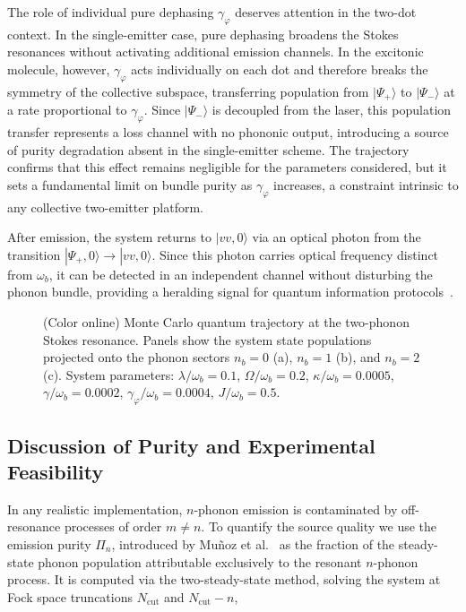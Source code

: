 \documentclass{ws-ijmpb}
\begin{document}
The role of individual pure dephasing $\gamma_\varphi$ deserves attention in the two-dot 
context. In the single-emitter case, pure dephasing broadens the Stokes resonances without 
activating additional emission channels. In the excitonic molecule, however, $\gamma_\varphi$ 
acts individually on each dot and therefore breaks the symmetry of the collective subspace, 
transferring population from $|\Psi_+\rangle$ to $|\Psi_-\rangle$ at a rate proportional to 
$\gamma_\varphi$. Since $|\Psi_-\rangle$ is decoupled from the laser, this population transfer 
represents a loss channel with no phononic output, introducing a source of purity degradation 
absent in the single-emitter scheme. The trajectory confirms that this effect remains negligible 
for the parameters considered, but it sets a fundamental limit on bundle purity as 
$\gamma_\varphi$ increases, a constraint intrinsic to any collective two-emitter platform.

After emission, the system returns to $|vv,0\rangle$ via an optical photon from the transition 
$|\Psi_+,0\rangle \to |vv,0\rangle$. Since this photon carries optical frequency distinct from 
$\omega_b$, it can be detected in an independent channel without disturbing the phonon bundle, 
providing a heralding signal for quantum information protocols~\cite{bin2020}.

\begin{figure}[H]
	\centering
	
	\caption{(Color online) Monte Carlo quantum trajectory at the two-phonon Stokes resonance. Panels show 
		the system state populations projected onto the phonon sectors $n_b = 0$ (a), $n_b = 1$ 
		(b), and $n_b = 2$ (c). System parameters: $\lambda/\omega_b = 0.1$, 
		$\Omega/\omega_b = 0.2$, $\kappa/\omega_b = 0.0005$, $\gamma/\omega_b = 0.0002$, 
		$\gamma_\varphi/\omega_b = 0.0004$, $J/\omega_b = 0.5$.}
	\label{fig:trayectoria}
\end{figure}

\subsection{Discussion of Purity and Experimental Feasibility}

In any realistic implementation, $n$-phonon emission is contaminated by off-resonance processes 
of order $m \neq n$. To quantify the source quality we use the emission purity $\Pi_n$, 
introduced by Mu\~noz et al.~\cite{munoz2014,munoz2018} as the fraction of the steady-state 
phonon population attributable exclusively to the resonant $n$-phonon process. It is computed 
via the two-steady-state method, solving the system at Fock space truncations $N_\mathrm{cut}$ 
and $N_\mathrm{cut} - n$,
\end{document}
